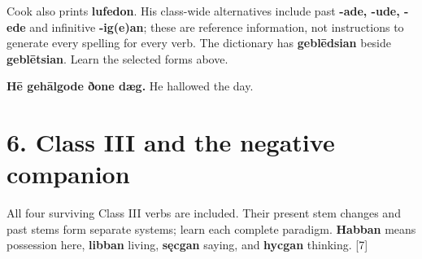 \par\endgroup
Cook also prints \textbf{lufedon}. His class-wide alternatives include past \textbf{-ade, -ude, -ede} and infinitive \textbf{-ig(e)an}; these are reference information, not instructions to generate every spelling for every verb. The dictionary has \textbf{geblēdsian} beside \textbf{geblētsian}. Learn the selected forms above.

\textbf{Hē gehālgode ðone dæg.} He hallowed the day.

\section*{6. Class III and the negative companion}

All four surviving Class III verbs are included. Their present stem changes and past stems form separate systems; learn each complete paradigm. \textbf{Habban} means possession here, \textbf{libban} living, \textbf{sęcgan} saying, and \textbf{hycgan} thinking. [7]

